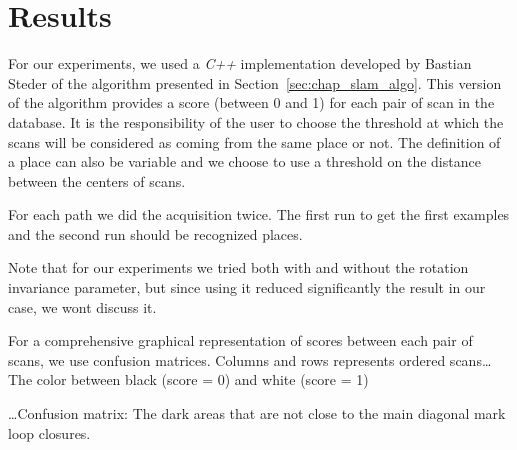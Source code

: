 \section{Results}
\label{sec:chap_slam_results}

For our experiments, we used a \textit{C++} implementation developed by Bastian Steder of the algorithm presented in Section~\ref{sec:chap_slam_algo}. This version of the algorithm provides a score (between 0 and 1) for each pair of scan in the database. It is the responsibility of the user to choose the threshold at which the scans will be considered as coming from the same place or not. The definition of a place can also be variable and we choose to use a threshold on the distance between the centers of scans. 

For each path we did the acquisition twice. The first run to get the first examples and the second run should be recognized places.

Note that for our experiments we tried both with and without the rotation invariance parameter, but since using it reduced significantly the result in our case, we wont discuss it. 

For a comprehensive graphical representation of scores between each pair of scans, we use confusion matrices. Columns and rows represents ordered scans\dots
The color between black (score = 0) and white (score = 1)

\dots Confusion matrix: The dark areas that are not close to the main diagonal mark loop closures.

\\

